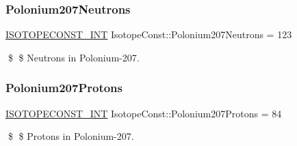 \subsubsection{\texorpdfstring{Polonium207\+Neutrons}{Polonium207Neutrons}}
{\footnotesize\ttfamily \mbox{\hyperlink{group___isotope_const-_macros_ga5f18360b3e99483a35c32d789e62621c}{I\+S\+O\+T\+O\+P\+E\+C\+O\+N\+S\+T\+\_\+\+I\+NT}} Isotope\+Const\+::\+Polonium207\+Neutrons = 123}

\$ \$ Neutrons in Polonium-\/207. \mbox{\label{group___isotope_const-_polonium-_po207_gadaff50db77aa5f2d809ebd6426570822}} 
\subsubsection{\texorpdfstring{Polonium207\+Protons}{Polonium207Protons}}
{\footnotesize\ttfamily \mbox{\hyperlink{group___isotope_const-_macros_ga5f18360b3e99483a35c32d789e62621c}{I\+S\+O\+T\+O\+P\+E\+C\+O\+N\+S\+T\+\_\+\+I\+NT}} Isotope\+Const\+::\+Polonium207\+Protons = 84}

\$ \$ Protons in Polonium-\/207. 